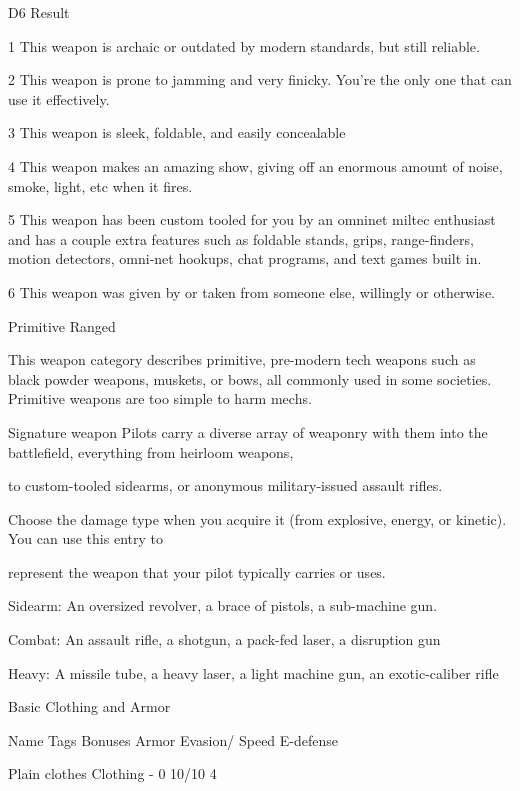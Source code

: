  D6      Result

 1       This weapon is archaic or outdated by modern standards, but still reliable.

 2       This weapon is prone to jamming and very finicky. You're the only one that can use it effectively.

 3       This weapon is sleek, foldable, and easily concealable

 4       This weapon makes an amazing show, giving off an enormous amount of noise, smoke, light, etc when it
         fires.

 5       This weapon has been custom tooled for you by an omninet miltec enthusiast and has a couple extra
         features such as foldable stands, grips, range-finders, motion detectors, omni-net hookups, chat programs,
         and text games built in.

 6       This weapon was given by or taken from someone else, willingly or otherwise.

Primitive Ranged

This weapon category describes primitive, pre-modern tech weapons such as black powder weapons,
muskets, or bows, all commonly used in some societies. Primitive weapons are too simple to harm mechs.


Signature weapon
Pilots carry a diverse array of weaponry with them into the battlefield, everything from heirloom weapons,

to custom-tooled sidearms, or anonymous military-issued assault rifles.


Choose the damage type when you acquire it (from explosive, energy, or kinetic). You can use this entry to

represent the weapon that your pilot typically carries or uses.


Sidearm: An oversized revolver, a brace of pistols, a sub-machine gun.


Combat: An assault rifle, a shotgun, a pack-fed laser, a disruption gun

Heavy: A missile tube, a heavy laser, a light machine gun, an exotic-caliber rifle


                                             Basic Clothing and Armor


    Name                Tags                Bonuses                              Armor        Evasion/         Speed
                                                                                              E-defense

    Plain clothes       Clothing            -                                    0            10/10            4

